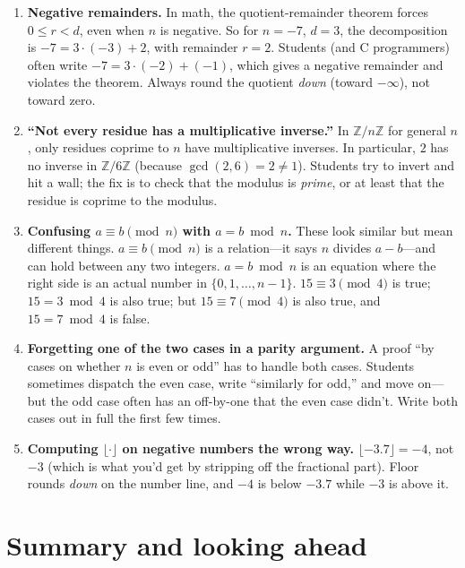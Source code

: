 \documentclass[11pt]{article}
\begin{document}
\begin{enumerate}
  \item \textbf{Negative remainders.} In math, the quotient-remainder theorem forces $0 \leq r < d$, even when $n$ is negative. So for $n = -7$, $d = 3$, the decomposition is $-7 = 3 \cdot (-3) + 2$, with remainder $r = 2$. Students (and C programmers) often write $-7 = 3 \cdot (-2) + (-1)$, which gives a negative remainder and violates the theorem. Always round the quotient \emph{down} (toward $-\infty$), not toward zero.
  \item \textbf{``Not every residue has a multiplicative inverse.''} In $\mathbb{Z}/n\mathbb{Z}$ for general $n$, only residues coprime to $n$ have multiplicative inverses. In particular, $2$ has no inverse in $\mathbb{Z}/6\mathbb{Z}$ (because $\gcd(2, 6) = 2 \neq 1$). Students try to invert and hit a wall; the fix is to check that the modulus is \emph{prime}, or at least that the residue is coprime to the modulus.
  \item \textbf{Confusing $a \equiv b \pmod n$ with $a = b \bmod n$.} These look similar but mean different things. $a \equiv b \pmod n$ is a relation---it says $n$ divides $a - b$---and can hold between any two integers. $a = b \bmod n$ is an equation where the right side is an actual number in $\{0, 1, \ldots, n-1\}$. $15 \equiv 3 \pmod 4$ is true; $15 = 3 \bmod 4$ is also true; but $15 \equiv 7 \pmod 4$ is also true, and $15 = 7 \bmod 4$ is false.
  \item \textbf{Forgetting one of the two cases in a parity argument.} A proof ``by cases on whether $n$ is even or odd'' has to handle both cases. Students sometimes dispatch the even case, write ``similarly for odd,'' and move on---but the odd case often has an off-by-one that the even case didn't. Write both cases out in full the first few times.
  \item \textbf{Computing $\lfloor \cdot \rfloor$ on negative numbers the wrong way.} $\lfloor -3.7 \rfloor = -4$, not $-3$ (which is what you'd get by stripping off the fractional part). Floor rounds \emph{down} on the number line, and $-4$ is below $-3.7$ while $-3$ is above it.
\end{enumerate}

\section{Summary and looking ahead}
\end{document}
